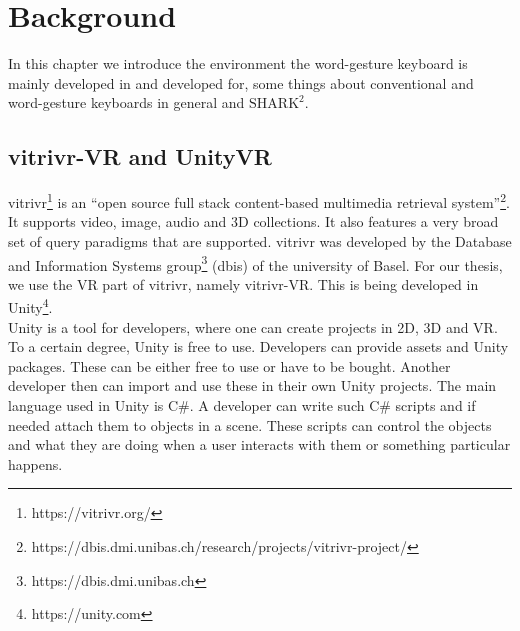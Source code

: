 \chapter{Background}

In this chapter we introduce the environment the word-gesture keyboard is mainly developed in and developed for, some things about conventional and word-gesture keyboards in general and $\text{SHARK}^2$.

\section{vitrivr-VR and UnityVR}
vitrivr\footnote{https://vitrivr.org/} is an ``open source full stack content-based multimedia retrieval system''\footnote{https://dbis.dmi.unibas.ch/research/projects/vitrivr-project/}. It supports video, image, audio and 3D collections. It also features a very broad set of query paradigms that are supported. vitrivr was developed by the Database and Information Systems group\footnote{https://dbis.dmi.unibas.ch} (dbis) of the university of Basel. For our thesis, we use the VR part of vitrivr, namely vitrivr-VR. This is being developed in Unity\footnote{https://unity.com}.\\
Unity is a tool for developers, where one can create projects in 2D, 3D and VR. To a certain degree, Unity is free to use. Developers can provide assets and Unity packages. These can be either free to use or have to be bought. Another developer then can import and use these in their own Unity projects. The main language used in Unity is C\#. A developer can write such C\# scripts and if needed attach them to objects in a scene. These scripts can control the objects and what they are doing when a user interacts with them or something particular happens. 

